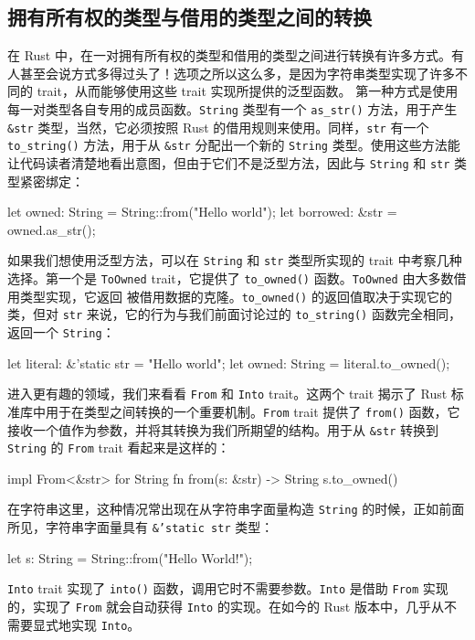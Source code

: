 \subsection{拥有所有权的类型与借用的类型之间的转换}
\label{idx:idx_7107fef9}
在 Rust 中，在一对拥有所有权的类型和借用的类型之间进行转换有许多方式。有人甚至会说方式多得过头了！选项之所以这么多，是因为字符串类型实现了许多不同的 trait，从而能够使用这些 trait 实现所提供的泛型函数。
第一种方式是使用每一对类型各自专用的成员函数。\texttt{String} 类型有一个 \texttt{as\_str()} 方法，用于产生 \texttt{\&str} 类型，当然，它必须按照 Rust 的借用规则来使用。同样，\texttt{str} 有一个 \texttt{to\_\allowbreak{}string(\allowbreak{})\allowbreak{}} 方法，用于从 \texttt{\&str} 分配出一个新的 \texttt{String} 类型。使用这些方法能让代码读者清楚地看出意图，但由于它们不是泛型方法，因此与 \texttt{String} 和 \texttt{str} 类型紧密绑定：
\begin{codebox}[rust]
let owned: String = String::from("Hello world");
let borrowed: &str = owned.as_str();
\end{codebox}
\label{idx:idx_f1c00432}
如果我们想使用泛型方法，可以在 \texttt{String} 和 \texttt{str} 类型所实现的 trait 中考察几种选择。第一个是 \texttt{ToOwned} trait，它提供了
\texttt{to\_owned()} 函数。\texttt{ToOwned} 由大多数借用类型实现，它返回
被借用数据的克隆。\texttt{to\_owned()} 的返回值取决于实现它的类，但对 \texttt{str} 来说，它的行为与我们前面讨论过的 \texttt{to\_\allowbreak{}string(\allowbreak{})\allowbreak{}} 函数完全相同，返回一个 \texttt{String}：
\begin{codebox}[rust]
let literal: &'static str = "Hello world";
let owned: String = literal.to_owned();
\end{codebox}
进入更有趣的领域，我们来看看 \texttt{From} 和 \texttt{Into} trait。这两个 trait 揭示了 Rust 标准库中用于在类型之间转换的一个重要机制。\texttt{From} trait 提供了 \texttt{from()} 函数，它接收一个值作为参数，并将其转换为我们所期望的结构。用于从 \texttt{\&str} 转换到 \texttt{String} 的 \texttt{From} trait 看起来是这样的：
\begin{codebox}[rust]
impl From<&str> for String {
    fn from(s: &str) -> String {
        s.to_owned()
    }
}
\end{codebox}
在字符串这里，这种情况常出现在从字符串字面量构造 \texttt{String} 的时候，正如前面所见，字符串字面量具有 \texttt{\&\allowbreak{}'static str} 类型：
\begin{codebox}[rust]
let s: String = String::from("Hello World!");
\end{codebox}
\texttt{Into} trait 实现了 \texttt{into()} 函数，调用它时不需要参数。\texttt{Into} 是借助 \texttt{From} 实现的，实现了 \texttt{From} 就会自动获得 \texttt{Into} 的实现。在如今的 Rust 版本中，几乎从不需要显式地实现 \texttt{Into}。
